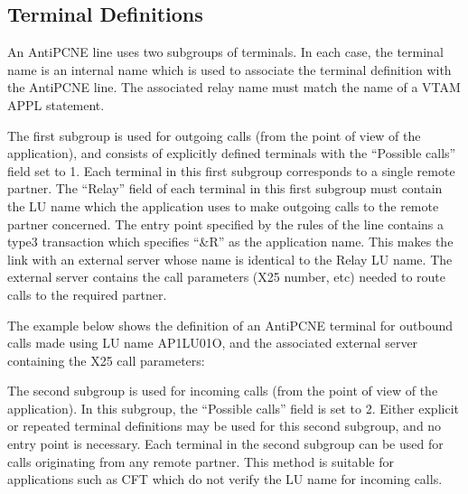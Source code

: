 \documentclass[letterpaper,10pt,english]{sphinxmanual}
\begin{document}
\ignorespaces 

\subsection{Terminal Definitions}
\label{\detokenize{connectivity_guide:index-84}}\label{\detokenize{connectivity_guide:id41}}
\sphinxAtStartPar
An AntiPCNE line uses two sub\sphinxhyphen{}groups of terminals. In each case, the terminal name is an internal name which is used to associate the terminal definition with the AntiPCNE line. The associated relay name must match the name of a VTAM APPL statement.

\sphinxAtStartPar
The first sub\sphinxhyphen{}group is used for outgoing calls (from the point of view of the application), and consists of explicitly defined  terminals with the “Possible calls” field set to 1. Each terminal in this first sub\sphinxhyphen{}group corresponds to a single remote partner. The “Relay” field of each terminal in this first sub\sphinxhyphen{}group must contain the LU name which the application uses to make outgoing calls to the remote partner concerned. The entry point specified by the rules of the line contains a type\sphinxhyphen{}3 transaction which specifies “\&R” as the
application name. This makes the link with an external server whose name is identical to the Relay LU name. The external server contains the call parameters (X25 number, etc) needed to route calls to the required partner.

\sphinxAtStartPar
The example below shows the definition of an AntiPCNE terminal for outbound calls made using LU name AP1LU01O, and the associated external server containing the X25 call parameters:

\sphinxAtStartPar
{}

\sphinxAtStartPar
{}

\sphinxAtStartPar
The second sub\sphinxhyphen{}group is used for incoming calls (from the point of view of the application). In this sub\sphinxhyphen{}group, the “Possible calls” field is set to 2. Either explicit or repeated terminal definitions may be used for this second sub\sphinxhyphen{}group, and no entry point is necessary. Each terminal in the second sub\sphinxhyphen{}group can be used for calls originating from any remote partner. This method is suitable for applications such as CFT which do not verify the LU name for incoming calls.
\end{document}
